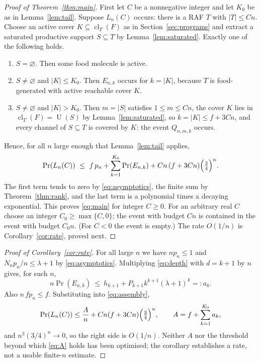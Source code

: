 \documentclass[11pt,a4paper]{article}
\theoremstyle{plain}
\theoremstyle{definition}
\theoremstyle{remark}
\newcommand{\cl}{\operatorname{cl}}
\newcommand{\Uni}{\operatorname{U}}
\begin{document}
\begin{proof}[Proof of Theorem~\ref{thm:main}]
First let $C$ be a nonnegative integer and let $K_0$ be as in Lemma~\ref{lem:tail}. Suppose $L_n(C)$ occurs: there is a RAF $T$ with $|T|\le Cn$. Choose an active cover $K\subseteq\cl_T(F)$ as in Section~\ref{sec:programs} and extract a saturated productive support $S\subseteq T$ by Lemma~\ref{lem:saturated}. Exactly one of the following holds.
\begin{enumerate}[label=(\alph*)]
\item $S=\varnothing$. Then some food molecule is active.
\item $S\ne\varnothing$ and $|K|\le K_0$. Then $E_{n,k}$ occurs for $k=|K|$, because $T$ is food-generated with active reachable cover $K$.
\item $S\ne\varnothing$ and $|K|>K_0$. Then $m=|S|$ satisfies $1\le m\le Cn$, the cover $K$ lies in $\cl_T(F)=\Uni(S)$ by Lemma~\ref{lem:saturated}, so $k=|K|\le f+3Cn$, and every channel of $S\subseteq T$ is covered by $K$: the event $Q_{n,m,k}$ occurs.
\end{enumerate}
Hence, for all $n$ large enough that Lemma~\ref{lem:tail} applies,
\begin{equation}\label{eq:assembly}
\Pr(L_n(C))\ \le\ f\,p_n+\sum_{k=1}^{K_0}\Pr(E_{n,k})+Cn\,(f+3Cn)\Bigl(\tfrac34\Bigr)^n .
\end{equation}
The first term tends to zero by \eqref{eq:asymptotics}, the finite sum by Theorem~\ref{thm:rank}, and the last term is a polynomial times a decaying exponential. This proves \eqref{eq:main} for integer $C\ge0$. For an arbitrary real $C$ choose an integer $C_0\ge\max\{C,0\}$; the event with budget $Cn$ is contained in the event with budget $C_0n$. (For $C<0$ the event is empty.) The rate $O(1/n)$ is Corollary~\ref{cor:rate}, proved next.
\end{proof}

\begin{proof}[Proof of Corollary~\ref{cor:rate}]
For all large $n$ we have $np_n\le1$ and $N_np_n/n\le\lambda+1$ by \eqref{eq:asymptotics}. Multiplying \eqref{eq:depth} with $d=k+1$ by $n$ gives, for such $n$,
\[
n\Pr(E_{n,k})\ \le\ h_{k+1}+P_{k+1}k^{k+1}(\lambda+1)^k=:a_k .
\]
Also $n\,fp_n\le f$. Substituting into \eqref{eq:assembly},
\begin{equation}\label{eq:A}
\Pr(L_n(C))\le\frac{A}{n}+Cn(f+3Cn)\Bigl(\tfrac34\Bigr)^n,\qquad A=f+\sum_{k=1}^{K_0}a_k ,
\end{equation}
and $n^3(3/4)^n\to0$, so the right side is $O(1/n)$. Neither $A$ nor the threshold beyond which \eqref{eq:A} holds has been optimised; the corollary establishes a rate, not a usable finite-$n$ estimate.
\end{proof}
\end{document}
